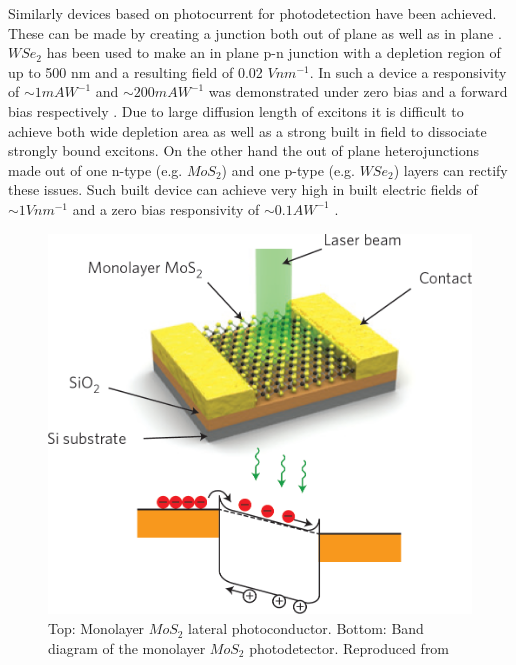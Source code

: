 Similarly devices based on photocurrent for photodetection have been achieved. These can be made by creating a junction both out of plane \cite{Withers2015}\cite{Cheng2014} as well as in plane \cite{Ross2014}\cite{Fontana2013}. $WSe_2$ has been used to make an in plane p-n junction with a depletion region of up to 500 nm and a resulting field of 0.02 $V nm^{-1}$.  In such a device a responsivity of $\sim 1 mAW^{-1}$ and $\sim 200 mAW^{-1}$ was demonstrated under zero bias and a forward bias respectively \cite{Baugher2014}. Due to large diffusion length of excitons it is difficult to achieve both wide depletion area as well as a strong built in field to dissociate strongly bound excitons. On the other hand the out of plane heterojunctions made out of one n-type (e.g. $MoS_2$) and one p-type (e.g. $WSe_2$) layers can rectify these issues. Such built device can achieve very high in built electric fields of $\sim 1 V nm^{-1}$ and a zero bias responsivity of $\sim 0.1 A W^{-1}$ \cite{Cheng2014}\cite{Lee2014}. 

\begin{figure}[!ht]
	\begin{center}
		\includegraphics[scale=0.35]{PhotodetectorDiagram.png}
		\caption{Top: Monolayer $MoS_2$ lateral photoconductor. Bottom: Band diagram of the monolayer $MoS_2$ photodetector. Reproduced from \cite{Mak2016}}
		\label{fig:PhotodetectorDiagram}
	\end{center}
\end{figure}

